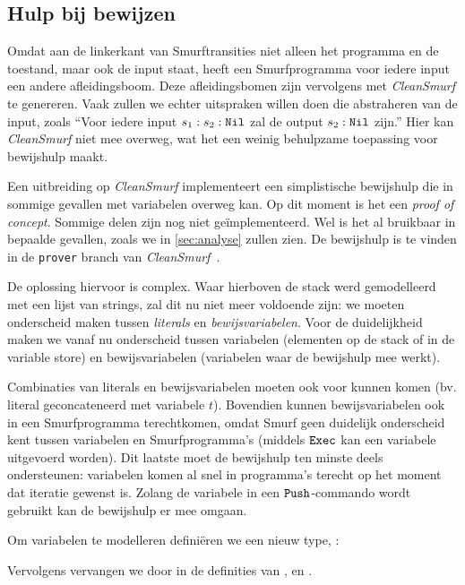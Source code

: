 \subsection{Hulp bij bewijzen}
\label{sec:cleansmurf:proofs}

Omdat aan de linkerkant van Smurftransities niet alleen het programma en de
toestand, maar ook de input staat, heeft een Smurfprogramma voor iedere input
een andere afleidingsboom. Deze afleidingsbomen zijn vervolgens met
\emph{CleanSmurf} te genereren. Vaak zullen we echter uitspraken willen doen
die abstraheren van de input, zoals ``Voor iedere input $s_1:s_2:\texttt{Nil}$ zal de
output $s_2:\texttt{Nil}$ zijn.'' Hier kan \emph{CleanSmurf} niet mee overweg, wat het
een weinig behulpzame toepassing voor bewijshulp maakt.

Een uitbreiding op \emph{CleanSmurf} implementeert een simplistische bewijshulp
die in sommige gevallen met variabelen overweg kan. Op dit moment is het een
\emph{proof of concept}. Sommige delen zijn nog niet geïmplementeerd. Wel is
het al bruikbaar in bepaalde gevallen, zoals we in \autoref{sec:analyse} zullen
zien. De bewijshulp is te vinden in de \texttt{prover} branch van
\emph{CleanSmurf}~\cite{cleansmurf}.

De oplossing hiervoor is complex. Waar hierboven de stack werd gemodelleerd met
een lijst van strings, zal dit nu niet meer voldoende zijn: we moeten
onderscheid maken tussen \emph{literals} en \emph{bewijsvariabelen}. Voor de
duidelijkheid maken we vanaf nu onderscheid tussen variabelen (elementen op de
stack of in de variable store) en bewijsvariabelen (variabelen waar de
bewijshulp mee werkt).

Combinaties van literals en bewijsvariabelen moeten ook voor kunnen komen (bv.
literal  geconcateneerd met variabele $t$). Bovendien kunnen
bewijsvariabelen ook in een Smurfprogramma terechtkomen, omdat Smurf geen
duidelijk onderscheid kent tussen variabelen en Smurfprogramma's (middels
$\texttt{Exec}$ kan een variabele uitgevoerd worden). Dit laatste moet de bewijshulp
ten minste deels ondersteunen: variabelen komen al snel in programma's terecht
op het moment dat iteratie gewenst is. Zolang de variabele in een
$\texttt{Push}$-commando wordt gebruikt kan de bewijshulp er mee omgaan.

Om variabelen te modelleren definiëren we een nieuw type, :



Vervolgens vervangen we  door  in de definities van
,  en .

